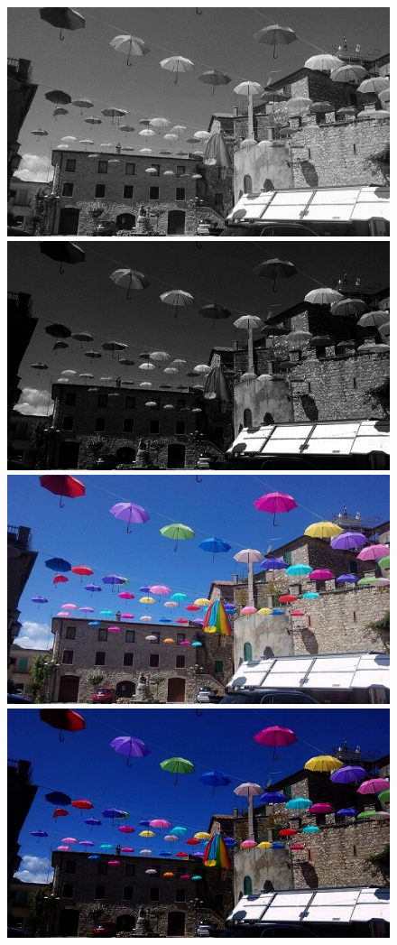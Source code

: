 \documentclass{article}
\begin{document}
	\begin{figure}[!ht]	
	\centering	
	\includegraphics[scale=0.8]{img/gray-obraz1}	
	\includegraphics[scale=0.8]{img/arytmetyczne/potegowanie-gray}\\
	\includegraphics[scale=0.8]{img/rgb-obraz1}	
	\includegraphics[scale=0.8]{img/arytmetyczne/potegowanie-rgb}

\end{figure}
\end{document}
